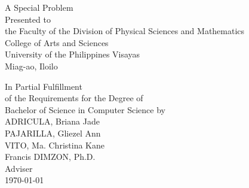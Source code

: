 \begin{titlepage}
	\centering
	
	
	\vspace{0.875cm}
	A Special Problem\\
	Presented to\\
	the Faculty of the Division of Physical Sciences and Mathematics\\
	College of Arts and Sciences\\
	University of the Philippines Visayas\\
	Miag-ao, Iloilo
	
	\vspace{0.875cm}
	In Partial Fulfillment\\
	of the Requirements for the Degree of\\
	Bachelor of Science in Computer Science
	\vspace{1.75cm}
	by\\
	
	\vspace*{-0.5cm}
	ADRICULA, Briana Jade  \\
	PAJARILLA, Gliezel Ann  \\
	VITO, Ma. Christina Kane  \\
	
	\vspace{0.875cm}
	Francis DIMZON, Ph.D.\\
	Adviser\\
	
	
	\vspace{0.875cm}
	\today
\end{titlepage}
